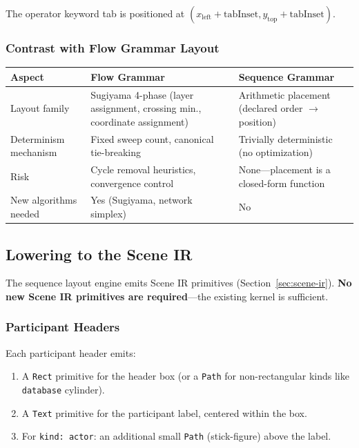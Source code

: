 The operator keyword tab is positioned at $(x_{\text{left}} + \text{tabInset}, y_{\text{top}} + \text{tabInset})$.

\subsubsection{Contrast with Flow Grammar Layout}

\begin{center}
\small
\begin{tabular}{lp{5cm}p{5cm}}
\toprule
\textbf{Aspect} & \textbf{Flow Grammar} & \textbf{Sequence Grammar} \\
\midrule
Layout family & Sugiyama 4-phase (layer assignment, crossing min., coordinate assignment) & Arithmetic placement (declared order $\rightarrow$ position) \\
Determinism mechanism & Fixed sweep count, canonical tie-breaking & Trivially deterministic (no optimization) \\
Risk & Cycle removal heuristics, convergence control & None---placement is a closed-form function \\
New algorithms needed & Yes (Sugiyama, network simplex) & No \\
\bottomrule
\end{tabular}
\end{center}

\subsection{Lowering to the Scene IR}
\label{sec:seq-lowering}

The sequence layout engine emits Scene IR primitives (Section~\ref{sec:scene-ir}). \textbf{No new Scene IR primitives are required}---the existing kernel is sufficient.

\subsubsection{Participant Headers}

Each participant header emits:
\begin{enumerate}
  \item A \texttt{Rect} primitive for the header box (or a \texttt{Path} for non-rectangular kinds like \texttt{database} cylinder).
  \item A \texttt{Text} primitive for the participant label, centered within the box.
  \item For \texttt{kind: actor}: an additional small \texttt{Path} (stick-figure) above the label.
\end{enumerate}

